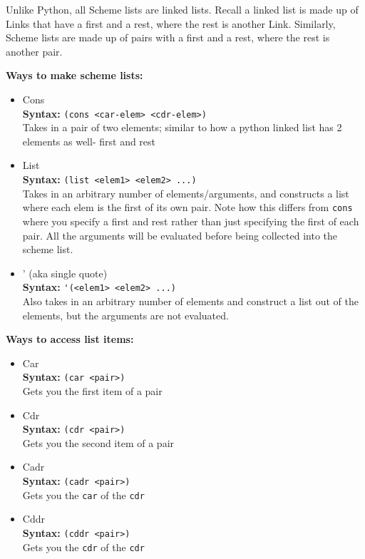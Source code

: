 Unlike Python, all Scheme lists are linked lists. Recall a linked list is made up of Links that have a first and a rest, where the rest is another Link. Similarly, Scheme lists are made up of pairs with a first and a rest, where the rest is another pair.

\textbf{Ways to make scheme lists:}
\begin{itemize}
\item Cons \\
\textbf{Syntax:} \lstinline{(cons <car-elem> <cdr-elem>)} \\
Takes in a pair of two elements; similar to how a python linked list has 2 elements as well- first and rest
\item List \\
\textbf{Syntax:} \lstinline{(list <elem1> <elem2> ...)} \\
Takes in an arbitrary number of elements/arguments, and constructs a list where each elem is the first of its own pair. Note how this differs from \lstinline{cons} where you specify a first and rest rather than just specifying the first of each pair. All the arguments will be evaluated before being collected into the scheme list.
\item ' (aka single quote) \\
\textbf{Syntax:} \lstinline{'(<elem1> <elem2> ...)} \\
Also takes in an arbitrary number of elements and construct a list out of the elements, but the arguments are not evaluated.
\end{itemize}

\textbf{Ways to access list items:}
\begin{itemize}
\item Car \\
\textbf{Syntax:} \lstinline{(car <pair>)} \\
Gets you the first item of a pair
\item Cdr \\ 
\textbf{Syntax:} \lstinline{(cdr <pair>)} \\
Gets you the second item of a pair
\end{itemize}
\begin{itemize}
\item Cadr \\
\textbf{Syntax:} \lstinline{(cadr <pair>)} \\
Gets you the \lstinline{car} of the \lstinline{cdr}
\end{itemize}
\begin{itemize}
\item Cddr \\
\textbf{Syntax:} \lstinline{(cddr <pair>)} \\
Gets you the \lstinline{cdr} of the \lstinline{cdr} 
\end{itemize}
